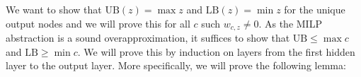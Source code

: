 \documentclass[]{article}
\newtheorem{lemma}{Lemma}
\theoremstyle{definition}
\newcommand{\ReLU}{\mathrm{ReLU}}
\newcommand{\UB}{\mathrm{UB}}
\newcommand{\LB}{\mathrm{LB}}
\newcommand{\B}{\mathrm{B}}
\begin{document}
%
%	
%	
%	
%	
%	


We want to show that $\mathrm{UB}(z) = \max z$ and $\mathrm{LB}(z) = \min z$ for the unique output nodes and we will prove this for all $c$ such $w_{c,z}\neq 0$. As the MILP abstraction is a sound overapproximation, 
it suffices to show that $\mathrm{UB}\leq \max c$ and $\mathrm{LB} \geq \min c$. We will prove this by induction on layers from the first hidden layer to the output layer. More specifically, we will prove the following lemma:
\end{document}
